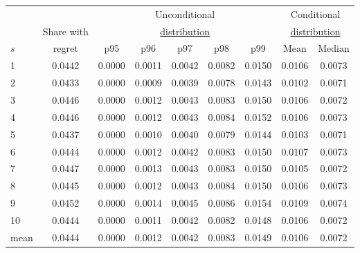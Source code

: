 \begin{tabular}{lcccccccc}
\toprule
& & \multicolumn{5}{c}{Unconditional} & \multicolumn{2}{c}{Conditional} \\
& Share with & \multicolumn{5}{c}{\uline{\hfill distribution \hfill}} & \multicolumn{2}{c}{\uline{\hfill distribution \hfill}} \\
 $s$ & regret & p95 & p96 & p97 & p98 & p99 & Mean & Median \\
\midrule
 1 & 0.0442 & 0.0000 & 0.0011 & 0.0042 & 0.0082 & 0.0150 & 0.0106 & 0.0073\\
2 & 0.0433 & 0.0000 & 0.0009 & 0.0039 & 0.0078 & 0.0143 & 0.0102 & 0.0071\\
3 & 0.0446 & 0.0000 & 0.0012 & 0.0043 & 0.0083 & 0.0150 & 0.0106 & 0.0072\\
4 & 0.0446 & 0.0000 & 0.0012 & 0.0043 & 0.0084 & 0.0152 & 0.0106 & 0.0073\\
5 & 0.0437 & 0.0000 & 0.0010 & 0.0040 & 0.0079 & 0.0144 & 0.0103 & 0.0071\\
6 & 0.0444 & 0.0000 & 0.0012 & 0.0042 & 0.0083 & 0.0150 & 0.0107 & 0.0073\\
7 & 0.0447 & 0.0000 & 0.0013 & 0.0043 & 0.0083 & 0.0150 & 0.0105 & 0.0072\\
8 & 0.0445 & 0.0000 & 0.0012 & 0.0043 & 0.0084 & 0.0150 & 0.0106 & 0.0073\\
9 & 0.0452 & 0.0000 & 0.0014 & 0.0045 & 0.0086 & 0.0154 & 0.0109 & 0.0074\\
10 & 0.0444 & 0.0000 & 0.0011 & 0.0042 & 0.0082 & 0.0148 & 0.0106 & 0.0072\\
\midrule
mean & 0.0444 & 0.0000 & 0.0012 & 0.0042 & 0.0083 & 0.0149 & 0.0106 & 0.0072\\
\bottomrule \end{tabular} 
